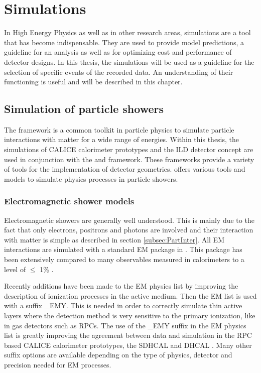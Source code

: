 \chapter{\geant Simulations}
\label{chap:G4Simulation}

In High Energy Physics as well as in other research areas, simulations are a tool that has become indispensable. They are used to provide model predictions, a guideline for an analysis as well as for optimizing cost and performance of detector designs. In this thesis, the simulations will be used as a guideline for the selection of specific events of the recorded data. An understanding of their functioning is useful and will be described in this chapter.

\section{Simulation of particle showers}

The \geant framework \cite{Agostinelli2003} is a common toolkit in particle physics to simulate particle interactions with matter for a wide range of energies. Within this thesis, the simulations of CALICE calorimeter prototypes and the ILD detector concept are used in conjunction with the \mokka \cite{Freitas2003} and \ddhep \cite{Frank2014} framework. These frameworks provide a variety of tools for the implementation of detector geometries. \geant offers various tools and models to simulate physics processes in particle showers.

\subsection{Electromagnetic shower models}

Electromagnetic showers are generally well understood. This is mainly due to the fact that only electrons, positrons and photons are involved and their interaction with matter is simple as described in section \ref{subsec:PartInter}. All EM interactions are simulated with a standard EM package in \geant \cite{Ivanchenko2010}. This package has been extensively compared to many observables measured in calorimeters to a level of $\leq$ 1\% \cite{Apostolakis2015}.

Recently additions have been made to the \geant EM physics list by improving the description of ionization processes in the active medium. Then the EM list is used with a suffix \_{}EMY. This is needed in order to correctly simulate thin active layers where the detection method is very sensitive to the primary ionization, like in gas detectors such as RPCs. The use of the \_{}EMY suffix in the EM physics list is greatly improving the agreement between data and simulation in the RPC based CALICE calorimeter prototypes, the SDHCAL and DHCAL \cite{Neubueser2016}. Many other suffix options are available depending on the type of physics, detector and precision needed for EM processes.

